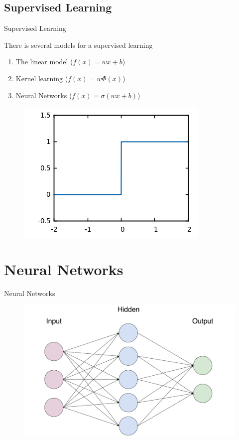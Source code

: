 \documentclass[mathserif]{beamer}
\begin{document}
\subsection{Supervised Learning}
\begin{frame}{Supervised Learning}
\begin{multicols}{2}
\small There is several models for a supervised learning

\begin{enumerate}
\item The linear model ($f(x)=wx+b$)
\item Kernel learning ($f(x)=w\Phi(x)$)
\item Neural Networks ($f(x)=\sigma(wx+b)$)
\end{enumerate}
\columnbreak
\begin{figure}[H]
\centering
\includegraphics[scale=0.4]{figures/step.png}
\end{figure}

\end{multicols}
\end{frame}



\section{Neural Networks}
\begin{frame}{Neural Networks}
\begin{figure}[H]
\centering
\includegraphics[scale=0.3]{figures/nnetwok.png}
\end{figure}
\end{frame}
\end{document}
